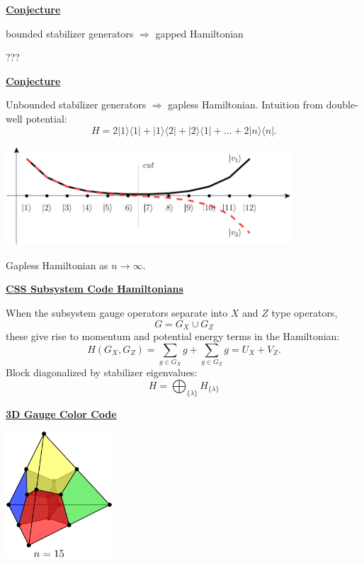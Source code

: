 \documentclass[11pt]{article}
\def\heading #1{\centerline{\underline{\bf\LARGE #1}}}
\def\vsp {\vspace*{0.5cm}}
\def\ket #1{|#1\rangle}
\def\bra #1{\langle #1|}
\begin{document}
\newpage %

\heading{Conjecture}


\vsp
\centerline{
bounded stabilizer generators $\Rightarrow$
gapped Hamiltonian}
\vsp
\centerline{\LARGE ???}

%

\newpage %

\heading{Conjecture}
Unbounded stabilizer generators $\Rightarrow$
gapless Hamiltonian.
Intuition from double-well potential:
$$
    H = 2\ket{1}\bra{1}
    + \ket{1}\bra{2} 
    + \ket{2}\bra{1} 
    + ...
    + 2\ket{n}\bra{n}.
$$
\vsp
\centerline{
\includegraphics[width=0.8\textwidth]{pic-dwell.pdf}}
\vspace*{-1.0cm}
Gapless Hamiltonian as $n\to \infty.$


\newpage %

\heading{CSS Subsystem Code Hamiltonians}


When the subsystem gauge operators separate into
$X$ and $Z$ type operators,
$$
    G = G_X \cup G_Z
$$
these give rise to momentum and potential energy terms
in the Hamiltonian:
\vspace*{-0.5cm}
$$
H(G_X, G_Z) = \sum_{g\in G_X} g + \sum_{g\in G_Z} g  =  U_X + V_Z.
$$
Block diagonalized by stabilizer eigenvalues:
\vspace*{-0.4cm}
$$
    H = \bigoplus_{\{\lambda \}} H_{\{\lambda\}}
$$


\newpage %

\heading{3D Gauge Color Code}

\vsp
\includegraphics[width=0.3\textwidth]{pic-gcolor-1.pdf}
\end{document}
